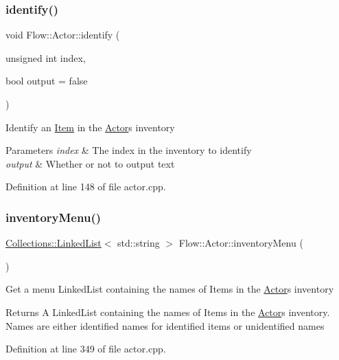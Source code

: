 \subsubsection{\texorpdfstring{identify()}{identify()}}
{\footnotesize\ttfamily void Flow\+::\+Actor\+::identify (\begin{DoxyParamCaption}\item[{unsigned int}]{index,  }\item[{bool}]{output = {\ttfamily false} }\end{DoxyParamCaption})}

Identify an \hyperlink{class_flow_1_1_item}{Item} in the \hyperlink{class_flow_1_1_actor}{Actor}\textquotesingle{}s inventory 
\begin{DoxyParams}{Parameters}
{\em index} & The index in the inventory to identify \\
\hline
{\em output} & Whether or not to output text \\
\hline
\end{DoxyParams}


Definition at line 148 of file actor.\+cpp.

\hypertarget{class_flow_1_1_actor_a57fa1f3f670561fbca7ad13ad6a6f35f}{}\label{class_flow_1_1_actor_a57fa1f3f670561fbca7ad13ad6a6f35f} 
\subsubsection{\texorpdfstring{inventory\+Menu()}{inventoryMenu()}}
{\footnotesize\ttfamily \hyperlink{class_collections_1_1_linked_list}{Collections\+::\+Linked\+List}$<$ std\+::string $>$ Flow\+::\+Actor\+::inventory\+Menu (\begin{DoxyParamCaption}{ }\end{DoxyParamCaption})}

Get a menu Linked\+List containing the names of Items in the \hyperlink{class_flow_1_1_actor}{Actor}\textquotesingle{}s inventory \begin{DoxyReturn}{Returns}
A Linked\+List containing the names of Items in the \hyperlink{class_flow_1_1_actor}{Actor}\textquotesingle{}s inventory. Names are either identified names for identified items or unidentified names 
\end{DoxyReturn}


Definition at line 349 of file actor.\+cpp.

